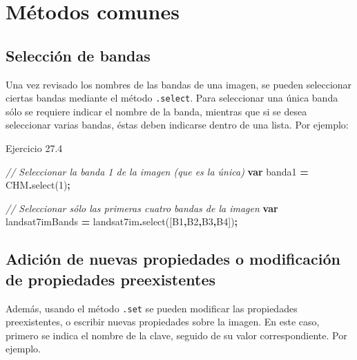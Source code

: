 \documentclass[
  12pt,
  letterpaper,
  twoside]{book}
\newenvironment{Shaded}{\begin{snugshade}}{\end{snugshade}}
\newcommand{\CommentTok}[1]{\textcolor[rgb]{0.56,0.35,0.01}{\textit{#1}}}
\newcommand{\FunctionTok}[1]{\textcolor[rgb]{0.00,0.00,0.00}{#1}}
\newcommand{\KeywordTok}[1]{\textcolor[rgb]{0.13,0.29,0.53}{\textbf{#1}}}
\newcommand{\NormalTok}[1]{#1}
\newcommand{\OperatorTok}[1]{\textcolor[rgb]{0.81,0.36,0.00}{\textbf{#1}}}
\newcommand{\StringTok}[1]{\textcolor[rgb]{0.31,0.60,0.02}{#1}}
\begin{document}
\hypertarget{muxe9todos-comunes-3}{%
\section{Métodos comunes}\label{muxe9todos-comunes-3}}

\hypertarget{selecciuxf3n-de-bandas}{%
\subsection{Selección de bandas}\label{selecciuxf3n-de-bandas}}

Una vez revisado los nombres de las bandas de una imagen, se pueden seleccionar ciertas bandas mediante el método \texttt{.select}. Para seleccionar una única banda sólo se requiere indicar el nombre de la banda, mientras que si se desea seleccionar varias bandas, éstas deben indicarse dentro de una lista. Por ejemplo:

Ejercicio 27.4

\begin{Shaded}
\begin{Highlighting}[]
\CommentTok{// Seleccionar la banda 1 de la imagen (que es la única)}
\KeywordTok{var}\NormalTok{ banda1 }\OperatorTok{=}\NormalTok{ CHM}\OperatorTok{.}\FunctionTok{select}\NormalTok{(}\StringTok{\textquotesingle{}1\textquotesingle{}}\NormalTok{)}\OperatorTok{;}

\CommentTok{// Seleccionar sólo las primeras cuatro bandas de la imagen}
\KeywordTok{var}\NormalTok{ landsat7imBands }\OperatorTok{=}\NormalTok{ landsat7im}\OperatorTok{.}\FunctionTok{select}\NormalTok{([}\StringTok{\textquotesingle{}B1\textquotesingle{}}\OperatorTok{,}\StringTok{\textquotesingle{}B2\textquotesingle{}}\OperatorTok{,}\StringTok{\textquotesingle{}B3\textquotesingle{}}\OperatorTok{,}\StringTok{\textquotesingle{}B4\textquotesingle{}}\NormalTok{])}\OperatorTok{;}
\end{Highlighting}
\end{Shaded}

\hypertarget{adiciuxf3n-de-nuevas-propiedades-o-modificaciuxf3n-de-propiedades-preexistentes-1}{%
\subsection{Adición de nuevas propiedades o modificación de propiedades preexistentes}\label{adiciuxf3n-de-nuevas-propiedades-o-modificaciuxf3n-de-propiedades-preexistentes-1}}

Además, usando el método \texttt{.set} se pueden modificar las propiedades preexistentes, o escribir nuevas propiedades sobre la imagen. En este caso, primero se indica el nombre de la clave, seguido de su valor correspondiente. Por ejemplo.
\end{document}
